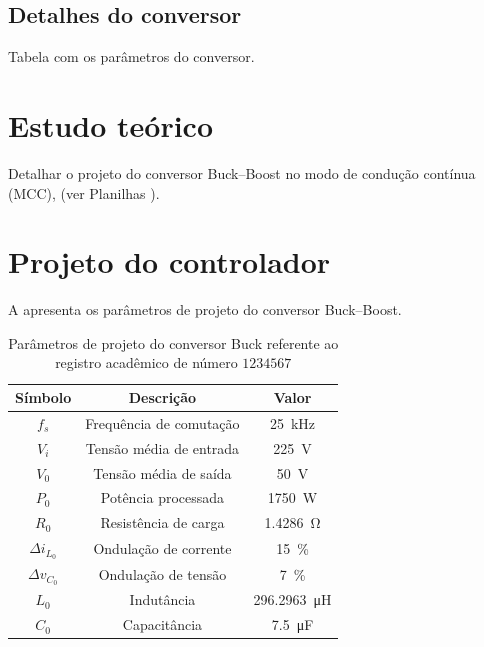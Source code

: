 \subsection{Detalhes do conversor}

Tabela com os parâmetros do conversor.



\section{Estudo teórico}

Detalhar o projeto do conversor Buck--Boost \cite{inep-cccc-2006} no modo de condução contínua (MCC), (ver Planilhas \cite{noauthor_ptc_nodate}).


\section{Projeto do controlador}

A  apresenta os parâmetros de projeto do conversor Buck--Boost.

\begin{table}[!ht]
	\centering
	\caption{Parâmetros de projeto do conversor Buck referente ao registro acadêmico de número $1234567$}
	\label{tab:parametros}
	\begin{tabular}{@{}ccc@{}}
		\toprule
		\textbf{Símbolo} & \textbf{Descrição} & \textbf{Valor}\\ \midrule
		$f_s$ & Frequência de comutação & \SI{25}{\kilo\hertz}\\
		$V_i$ & Tensão média de entrada  & \SI{225}{\V}\\
		$V_0$ & Tensão média de saída  & \SI{50}{\V} \\
		$P_0$ & Potência processada  & \SI{1750}{\W} \\
		$R_0$ & Resistência de carga & \SI{1.4286}{\ohm} \\
		$\Delta{i_{L_0}}$  & Ondulação de corrente & \SI{15}{\%}\\
		$\Delta{v_{C_0}}$  & Ondulação de tensão & \SI{7}{\%}\\
		$L_0$ & Indutância & \SI{296.2963}{\micro\henry}\\
		$C_0$ & Capacitância & \SI{7.5}{\micro\farad}\\
		\bottomrule
	\end{tabular}
\end{table}



